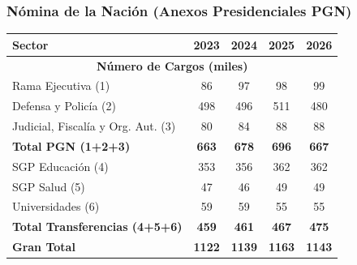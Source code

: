\begin{frame}
  \frametitle{Nómina de la Nación \small{(Anexos Presidenciales PGN)}}
  \begin{center}
    \begin{tabular}{lcccc}
        \hline
        \textbf{Sector} & \textbf{2023} & \textbf{2024} & \textbf{2025} & \textbf{2026} \\
        \hline
        \multicolumn{5}{c}{\textbf{Número de Cargos (miles)}} \\
        \hline
        Rama Ejecutiva (1) & 86 & 97 & 98 & 99 \\
        Defensa y Policía (2) & 498 & 496 & 511 & 480 \\
        Judicial, Fiscalía y Org. Aut. (3) & 80 & 84 & 88 & 88 \\
        \hline
        \textbf{Total PGN (1+2+3)} & \textbf{663} & \textbf{678} & \textbf{696} & \textbf{667} \\ \hline
        SGP Educación (4) & 353 & 356 & 362 & 362 \\ 
        SGP Salud (5) & 47 & 46 & 49 & 49 \\
        Universidades (6) & 59 & 59 & 55 & 55 \\ \hline
        \textbf{Total Transferencias (4+5+6)} & \textbf{459} & \textbf{461} & \textbf{467} & \textbf{475} \\ \hline
        \textbf{Gran Total} & \textbf{1122} & \textbf{1139} & \textbf{1163} & \textbf{1143} \\
        \hline
    \end{tabular}
  \end{center}
\end{frame}
